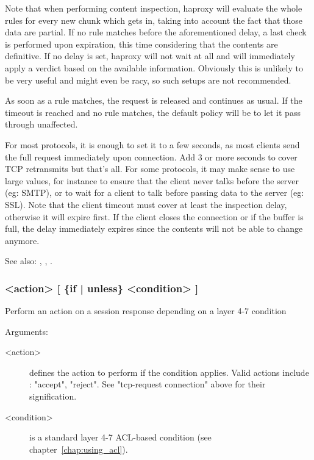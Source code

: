   Note that when performing content inspection, haproxy will evaluate the whole
  rules for every new chunk which gets in, taking into account the fact that
  those data are partial. If no rule matches before the aforementioned delay,
  a last check is performed upon expiration, this time considering that the
  contents are definitive. If no delay is set, haproxy will not wait at all
  and will immediately apply a verdict based on the available information.
  Obviously this is unlikely to be very useful and might even be racy, so such
  setups are not recommended.

  As soon as a rule matches, the request is released and continues as usual. If
  the timeout is reached and no rule matches, the default policy will be to let
  it pass through unaffected.

  For most protocols, it is enough to set it to a few seconds, as most clients
  send the full request immediately upon connection. Add 3 or more seconds to
  cover TCP retransmits but that's all. For some protocols, it may make sense
  to use large values, for instance to ensure that the client never talks
  before the server (eg: SMTP), or to wait for a client to talk before passing
  data to the server (eg: SSL). Note that the client timeout must cover at
  least the inspection delay, otherwise it will expire first. If the client
  closes the connection or if the buffer is full, the delay immediately expires
  since the contents will not be able to change anymore.


See also: , ,
            .

\subsubsection[tcp-response content]{ <action> [ \{if | unless\} <condition> ]}

  Perform an action on a session response depending on a layer 4-7 condition


  Arguments:
  \begin{description}
  \item[<action>] defines the action to perform if the condition applies. Valid
                actions include : "accept", "reject".
                See "tcp-request connection" above for their signification.

  \item[<condition>] is a standard layer 4-7 ACL-based condition (see chapter~\ref{chap:using_acl}).
  \end{description}

